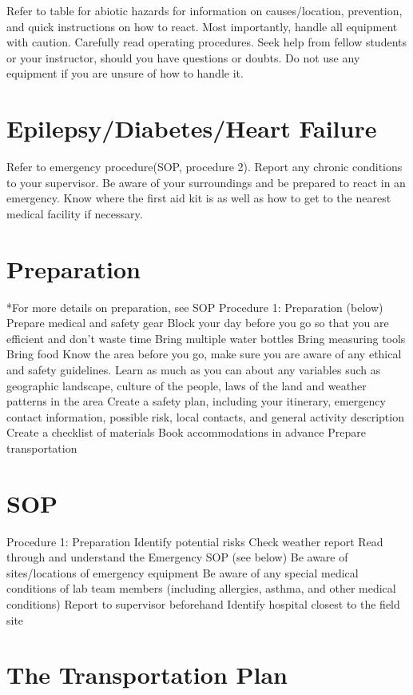 \documentclass[12pt]{../SOP2}
\begin{document}
\NP Refer to table for abiotic hazards for information on causes/location, prevention, and quick instructions on how to react. Most importantly, handle all equipment with caution. Carefully read operating procedures. Seek help from fellow students or your instructor, should you have questions or doubts. Do not use any equipment if you are unsure of how to handle it. 

\section{Epilepsy/Diabetes/Heart Failure}

Refer to emergency procedure(SOP, procedure 2).
Report any chronic conditions to your supervisor.
Be aware of your surroundings and be prepared to react in an emergency.
Know where the first aid kit is as well as how to get to the nearest medical facility if necessary. 


\section{Preparation}

*For more details on preparation, see SOP Procedure 1: Preparation (below)
Prepare medical and safety gear 
Block your day before you go so that you are efficient and don't waste time
Bring multiple water bottles
Bring measuring tools
Bring food
Know the area before you go, make sure you are aware of any ethical and safety guidelines. Learn as much as you can about any variables such as geographic landscape, culture of the people, laws of the land and weather patterns in the area
Create a safety plan, including your itinerary, emergency contact information, possible risk, local contacts, and general activity description 
Create a checklist of materials 
Book accommodations in advance
Prepare transportation

\section{SOP}

Procedure 1: Preparation
Identify potential risks
Check weather report
Read through and understand the Emergency SOP (see below)
Be aware of sites/locations of emergency equipment
Be aware of any special medical conditions of lab team members (including allergies, asthma, and other medical conditions)
Report to supervisor beforehand
Identify hospital closest to the field site


\section{The Transportation Plan}
\end{document}
